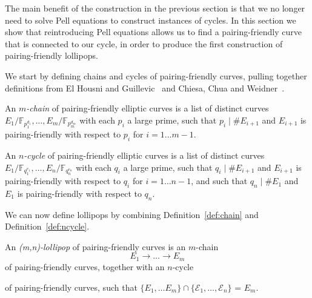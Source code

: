 \documentclass[version=preprint]{iacrcc}
\newcommand{\F}{\mathbb{F}}
\newcommand{\EC}{\mathcal{E}}
\begin{document}

The main benefit of the construction in the previous section is that we no longer need to solve Pell equations to construct instances of cycles. In this section we show that reintroducing Pell equations allows us to find a pairing-friendly curve that is connected to our cycle, in order to produce the first construction of pairing-friendly lollipops. 


We start by defining chains and cycles of pairing-friendly curves, pulling together definitions from El Housni and Guillevic~\cite[\S 2.3]{DBLP:conf/eurocrypt/HousniG22} and Chiesa, Chua and Weidner~\cite[Definition 7.1]{chiesa2019cycles}. 

\begin{definition}\label{def:chain}
An \emph{$m$-chain} of pairing-friendly elliptic curves is a list of distinct curves $E_1/\F_{p_1^{d_1}},\dots, E_m/\F_{p_m^{d_m}}$ with each $p_i$ a large prime, such that $p_i \mid \#E_{i+1}$ and $E_{i+1}$ is pairing-friendly with respect to $p_i$ for $i=1\dots m-1$. 
\end{definition}

\begin{definition}\label{def:ncycle}
An \emph{$n$-cycle} of pairing-friendly elliptic curves is a list of distinct curves $E_1/\F_{q_1^{e_1}},\dots, E_n/\F_{q_n^{e_n}}$ with each $q_i$ a large prime, such that $q_i \mid \#E_{i+1}$ and $E_{i+1}$ is pairing-friendly with respect to $q_i$ for $i=1\dots n-1$, and such that $q_n \mid \#E_1$ and $E_1$ is pairing-friendly with respect to $q_n$. 
\end{definition}

We can now define lollipops by combining Definition~\ref{def:chain} and Definition~\ref{def:ncycle}. 

\begin{definition}\label{def:lollipop}
An \emph{(m,n)-lollipop} of pairing-friendly curves is an $m$-chain
\[
E_1 \rightarrow \dots \rightarrow E_{m} 
\]
of pairing-friendly curves, together with an $n$-cycle 
\begin{center}
\end{center}
of pairing-friendly curves, such that $\{E_1,\dots E_m\} \cap \{\EC_{1},  \dots , \EC_{n} \}$ = $E_m$. 
\end{definition}
\end{document}
